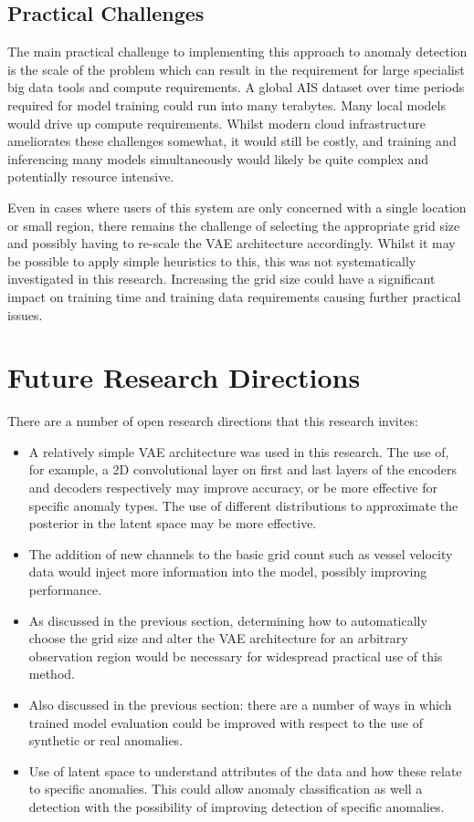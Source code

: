 \documentclass{mldsmsc}
\begin{document}
\subsection{Practical Challenges}

The main practical challenge to implementing this approach to anomaly detection is the scale of the problem which can result in the requirement for large specialist big data tools and compute requirements. A global AIS dataset over time periods required for model training could run into many terabytes. Many local models would drive up compute requirements.  Whilst modern cloud infrastructure ameliorates these challenges somewhat, it would still be costly, and training and inferencing many models simultaneously would likely be quite complex and potentially resource intensive.

Even in cases where users of this system are only concerned with a single location or small region, there remains the challenge of selecting the appropriate grid size and possibly having to re-scale the VAE architecture accordingly. Whilst it may be possible to apply simple heuristics to this, this was not systematically investigated in this research. Increasing the grid size could have a significant impact on training time and training data requirements causing further practical issues.



\section{Future Research Directions}

There are a number of open research directions that this research invites:

\begin{itemize}
	\item A relatively simple VAE architecture was used in this research. The use of, for example, a 2D convolutional layer on first and last layers of the encoders and decoders respectively may improve accuracy, or be more effective for specific anomaly types. The use of different distributions to approximate the posterior in the latent space may be more effective. 
	\item The addition of new channels to the basic grid count such as vessel velocity data would inject more information into the model, possibly improving performance.
	\item As discussed in the previous section, determining how to automatically choose the grid size and alter the VAE architecture for an arbitrary observation region would be necessary for widespread practical use of this method.
	\item Also discussed in the previous section: there are a number of ways in which trained model evaluation could be improved with respect to the use of synthetic or real anomalies.
	\item Use of latent space to understand attributes of the data and how these relate to specific anomalies. This could allow anomaly classification as well a detection with the possibility of improving detection of specific anomalies. 
\end{itemize}
\end{document}
